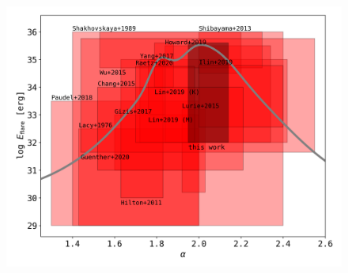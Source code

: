 \documentclass{aa}
\begin{document}
\begin{appendix}
   \begin{figure}[ht!]
   \centering
            \includegraphics[width=\hsize]{pics/appendix/overview_alpha_literature.png}

\end{figure}
\end{appendix}
\end{document}
